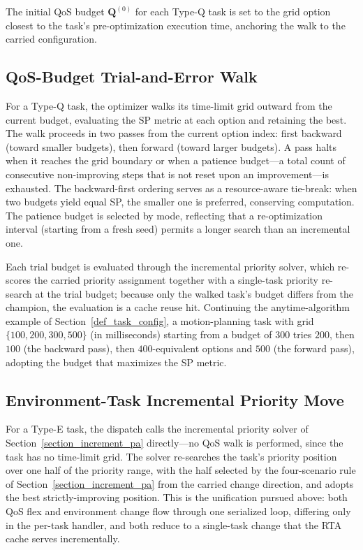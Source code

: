     The initial QoS budget $\boldsymbol{Q}^{(0)}$ for each Type-Q task is set to the grid option closest to the task's pre-optimization execution time, anchoring the walk to the carried configuration.

    \subsection{QoS-Budget Trial-and-Error Walk}
    \label{section_qos_walk}

    For a Type-Q task, the optimizer walks its time-limit grid outward from the current budget, evaluating the SP metric at each option and retaining the best.
    The walk proceeds in two passes from the current option index: first backward (toward smaller budgets), then forward (toward larger budgets).
    A pass halts when it reaches the grid boundary or when a patience budget---a total count of consecutive non-improving steps that is not reset upon an improvement---is exhausted.
    The backward-first ordering serves as a resource-aware tie-break: when two budgets yield equal SP, the smaller one is preferred, conserving computation.
    The patience budget is selected by mode, reflecting that a re-optimization interval (starting from a fresh seed) permits a longer search than an incremental one.

    Each trial budget is evaluated through the incremental priority solver, which re-scores the carried priority assignment together with a single-task priority re-search at the trial budget; because only the walked task's budget differs from the champion, the evaluation is a cache reuse hit.
    Continuing the anytime-algorithm example of Section~\ref{def_task_config}, a motion-planning task with grid $\{100, 200, 300, 500\}$ (in milliseconds) starting from a budget of $300$ tries $200$, then $100$ (the backward pass), then $400$-equivalent options and $500$ (the forward pass), adopting the budget that maximizes the SP metric.

    \subsection{Environment-Task Incremental Priority Move}
    \label{section_env_pa_move}

    For a Type-E task, the dispatch calls the incremental priority solver of Section~\ref{section_increment_pa} directly---no QoS walk is performed, since the task has no time-limit grid.
    The solver re-searches the task's priority position over one half of the priority range, with the half selected by the four-scenario rule of Section~\ref{section_increment_pa} from the carried change direction, and adopts the best strictly-improving position.
    This is the unification pursued above: both QoS flex and environment change flow through one serialized loop, differing only in the per-task handler, and both reduce to a single-task change that the RTA cache serves incrementally.

